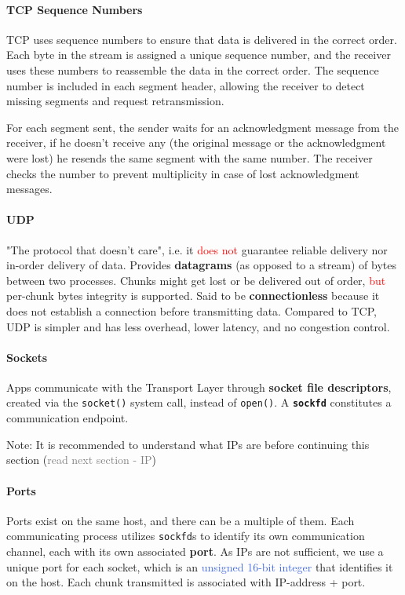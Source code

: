 \documentclass[openany,12pt]{book}
\newcommand{\code}[1]{\texttt{#1}}
\newcommand{\red}[1]{\textcolor{Red}{#1}}
\newcommand{\blue}[1]{\textcolor{RoyalBlue}{#1}}
\newcommand{\gray}[1]{\textcolor{gray}{#1}}
\begin{document}
\paragraph{TCP Sequence Numbers} TCP uses sequence numbers to ensure that data is delivered in the correct order. Each byte in the stream is assigned a unique sequence number, and the receiver uses these numbers to reassemble the data in the correct order. The sequence number is included in each segment header, allowing the receiver to detect missing segments and request retransmission. 

For each segment sent, the sender waits for an acknowledgment message from the receiver, if he doesn't receive any (the original message or the acknowledgment were lost) he resends the same segment with the same number. The receiver checks the number to prevent multiplicity in case of lost acknowledgment messages.

\paragraph{UDP} "The protocol that doesn't care", i.e. it \red{does not} guarantee reliable delivery nor in-order delivery of data. Provides \textbf{datagrams} (as opposed to a stream) of bytes between two processes. Chunks might get lost or be delivered out of order, \red{but} per-chunk bytes integrity is supported. Said to be \textbf{connectionless} because it does not establish a connection before transmitting data. Compared to TCP, UDP is simpler and has less overhead, lower latency, and no congestion control.

\paragraph{Sockets} Apps communicate with the Transport Layer through \textbf{socket file descriptors}, created via the \code{socket()} system call, instead of \code{open()}. A \textbf{\code{sockfd}} constitutes a communication endpoint.

Note: It is recommended to understand what IPs are before continuing this section (\gray{read next section - IP})

\paragraph{Ports} Ports exist on the same host, and there can be a multiple of them. Each communicating process utilizes \code{sockfd}s to identify its own communication channel, each with its own associated \textbf{port}. As IPs are not sufficient, we use a unique port for each socket, which is an \blue{unsigned 16-bit integer} that identifies it on the host. Each chunk transmitted is associated with IP-address + port.
\end{document}
